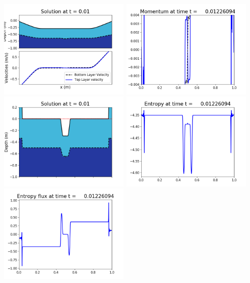 \documentclass[11pt]{article}
\begin{document}
\includegraphics[width=0.475\textwidth]{frame0029fig1002.png}
\vskip 10pt 
\includegraphics[width=0.475\textwidth]{frame0029fig1003.png}
\includegraphics[width=0.475\textwidth]{frame0029fig1006.png}
\vskip 10pt 
\includegraphics[width=0.475\textwidth]{frame0029fig1007.png}
\includegraphics[width=0.475\textwidth]{frame0029fig1008.png}
\end{document}
